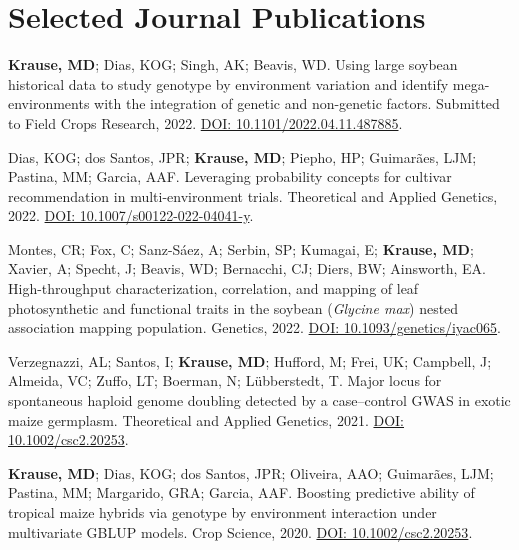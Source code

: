 \documentclass[]{mdkrause_cv_openfont}
\begin{document}
\begin{minipage}[t]{1\textwidth} 


\section{Selected Journal Publications} 

\sectionsep
\textbf{Krause, MD}; Dias, KOG; Singh, AK; Beavis, WD. Using large soybean historical data to study genotype by environment variation and identify mega-environments with the integration of genetic and non-genetic factors. Submitted to Field Crops Research, 2022. \href{https://www.biorxiv.org/content/10.1101/2022.04.11.487885v3.abstract}{DOI: 10.1101/2022.04.11.487885}. \ExternalLink

\sectionsep
Dias, KOG; dos Santos, JPR; \textbf{Krause, MD}; Piepho, HP; Guimarães, LJM; Pastina, MM; Garcia, AAF. Leveraging probability concepts for cultivar recommendation in multi-environment trials. Theoretical and Applied Genetics, 2022. \href{https://link.springer.com/article/10.1007/s00122-022-04041-y}{DOI: 10.1007/s00122-022-04041-y}. \ExternalLink 

\sectionsep
Montes, CR; Fox, C; Sanz-Sáez, A; Serbin, SP; Kumagai, E; \textbf{Krause, MD}; Xavier, A; Specht, J; Beavis, WD; Bernacchi, CJ; Diers, BW; Ainsworth, EA. High-throughput characterization, correlation, and mapping of leaf photosynthetic and functional traits in the soybean (\textit{Glycine max}) nested association mapping population. Genetics, 2022. \href{https://academic.oup.com/genetics/advance-article/doi/10.1093/genetics/iyac065/6572345?login=true}{DOI: 10.1093/genetics/iyac065}. \ExternalLink

\sectionsep
Verzegnazzi, AL; Santos, I; \textbf{Krause, MD}; Hufford, M; Frei, UK; Campbell, J; Almeida, VC; Zuffo, LT; Boerman, N; Lübberstedt, T. Major locus for spontaneous haploid genome doubling detected by a case–control GWAS in exotic maize germplasm. Theoretical and Applied Genetics, 2021. \href{https://link.springer.com/article/10.1007/s00122-021-03780-8}{DOI: 10.1002/csc2.20253}. \ExternalLink 

\sectionsep
\textbf{Krause, MD}; Dias, KOG; dos Santos, JPR; Oliveira, AAO; Guimarães, LJM; Pastina, MM; Margarido, GRA; Garcia, AAF. Boosting predictive ability of tropical maize hybrids via genotype by environment interaction under multivariate GBLUP models. Crop Science, 2020. \href{https://acsess.onlinelibrary.wiley.com/doi/full/10.1002/csc2.20253}{DOI: 10.1002/csc2.20253}. \ExternalLink 


\end{minipage}
\end{document}
